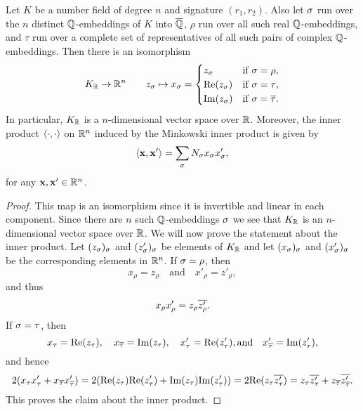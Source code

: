     \begin{proposition}\label{prop:Minkowski_space_isomorphism}
      Let $K$ be a number field of degree $n$ and signature $(r_{1},r_{2})$. Also let $\sigma$ run over the $n$ distinct $\mathbb{Q}$-embeddings of $K$ into $\overline{\mathbb{Q}}$, $\rho$ run over all such real $\mathbb{Q}$-embeddings, and $\tau$ run over a complete set of representatives of all such pairs of complex $\mathbb{Q}$-embeddings. Then there is an isomorphism
      \[
        K_{\mathbb{R}} \to \mathbb{R}^{n} \qquad z_{\sigma} \mapsto x_{\sigma} = \begin{cases} z_{\sigma} & \text{if $\sigma = \rho$}, \\ \mathrm{Re}(z_{\sigma}) & \text{if $\sigma = \tau$}, \\ \mathrm{Im}(z_{\sigma}) & \text{if $\sigma = \overline{\tau}$}. \end{cases}
      \]
      In particular, $K_{\mathbb{R}}$ is a $n$-dimensional vector space over $\mathbb{R}$. Moreover, the inner product $\langle\cdot,\cdot\rangle$ on $\mathbb{R}^{n}$ induced by the Minkowski inner product is given by
      \[
        \langle\mathbf{x},\mathbf{x}'\rangle = \sum_{\sigma}N_{\sigma}x_{\sigma}x'_{\sigma},
      \]
      for any $\mathbf{x},\mathbf{x}' \in \mathbb{R}^{n}$.
    \end{proposition}
    \begin{proof}
      This map is an isomorphism since it is invertible and linear in each component. Since there are $n$ such $\mathbb{Q}$-embeddings $\sigma$ we see that $K_{\mathbb{R}}$ is an $n$-dimensional vector space over $\mathbb{R}$. We will now prove the statement about the inner product. Let $(z_{\sigma})_{\sigma}$ and $(z'_{\sigma})_{\sigma}$ be elements of $K_{\mathbb{R}}$ and let $(x_{\sigma})_{\sigma}$ and $(x'_{\sigma})_{\sigma}$ be the corresponding elements in $\mathbb{R}^{n}$. If $\sigma = \rho$, then
      \[
        x_{\rho} = z_{\rho} \quad \text{and} \quad x'_{\rho} = z'_{\rho},
      \]
      and thus
      \[
        x_{\rho}x'_{\rho} = z_{\rho}\overline{z'_{\rho}}.
      \]
      If $\sigma = \tau$, then
      \[
        x_{\tau} = \mathrm{Re}(z_{\tau}), \quad x_{\overline{\tau}} = \mathrm{Im}(z_{\tau}), \quad x'_{\tau} = \mathrm{Re}(z'_{\tau}), \text{and} \quad x'_{\overline{\tau}} = \mathrm{Im}(z'_{\tau}),
      \]
      and hence
      \[
        2(x_{\tau}x'_{\tau}+x_{\overline{\tau}}x'_{\overline{\tau}}) = 2(\mathrm{Re}(z_{\tau})\mathrm{Re}(z'_{\tau})+\mathrm{Im}(z_{\tau})\mathrm{Im}(z'_{\tau})) = 2\mathrm{Re}(z_{\tau}\overline{z'_{\tau}}) = z_{\tau}\overline{z'_{\tau}}+z_{\overline{\tau}}\overline{z'_{\overline{\tau}}}.
      \]
      This proves the claim about the inner product.
    \end{proof}
    
